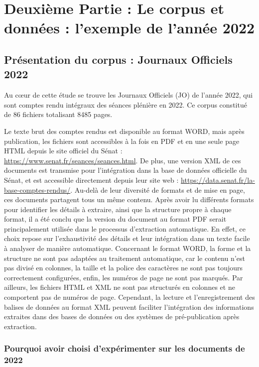 \chapter*{Deuxième Partie : Le corpus et données : l’exemple de l’année 2022}
\setcounter{chapter}{2}  %

\section{Présentation du corpus : Journaux Officiels 2022}

Au cœur de cette étude se trouve les Journaux Officiels (JO) de l'année 2022, qui sont comptes rendu intégraux des séances plénière en 2022. Ce corpus constitué de 86 fichiers totalisant 8485 pages.

Le texte brut des comptes rendus est disponible au format WORD, mais après publication, les fichiers sont accessibles à la fois en \gls{PDF} et en une seule page \gls{HTML} depuis le site officiel du Sénat : \url{https://www.senat.fr/seances/seances.html}.
De plus, une version \gls{XML} de ces documents est transmise pour l'intégration dans la base de données officielle du Sénat, et est accessible directement depuis leur site web : \url{https://data.senat.fr/la-base-comptes-rendus/}.
Au-delà de leur diversité de formats et de mise en page, ces documents partagent tous un même contenu. Après avoir lu différents formats pour identifier les détails à extraire, ainsi que la structure propre à chaque format, il a été conclu que la version du document au format \gls{PDF} serait principalement utilisée dans le processus d'extraction automatique. En effet, ce choix repose sur l'exhaustivité des détails et leur intégration dans un texte facile à analyser de manière automatique. Concernant le format WORD, la forme et la structure ne sont pas adaptées au traitement automatique, car le contenu n'est pas divisé en colonnes, la taille et la police des caractères ne sont pas toujours correctement configurées, enfin, les numéros de page ne sont pas marqués.
Par ailleurs, les fichiers \gls{HTML} et \gls{XML} ne sont pas structurés en colonnes et ne comportent pas de numéros de page. Cependant, la lecture et l'enregistrement des balises de données au format \gls{XML} peuvent faciliter l'intégration des informations extraites dans des bases de données ou des systèmes de pré-publication après extraction.

\subsection{Pourquoi avoir choisi d’expérimenter sur les documents de 2022}

